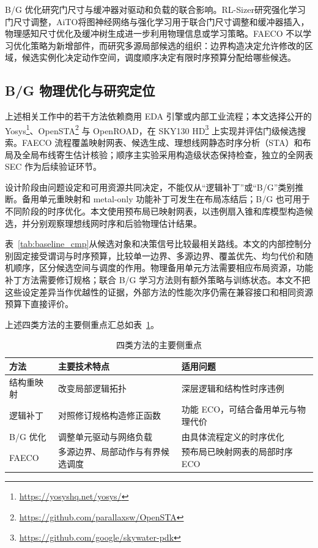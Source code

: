 \documentclass[twocolumn,10pt,fontset=windows]{ctexart}
\begin{document}
B/G 优化研究门尺寸与缓冲器对驱动和负载的联合影响。RL-Sizer\cite{liu2021rlsizer}研究强化学习门尺寸调整，AiTO\cite{chen2024aito}将图神经网络与强化学习用于联合门尺寸调整和缓冲器插入，物理感知尺寸优化\cite{huang2025phys}及缓冲树生成\cite{zhang2025buffalo}进一步利用物理信息或学习策略。FAECO 不以学习优化策略为新增部件，而研究多源局部候选的组织：边界构造决定允许修改的区域，候选实例化决定动作空间，调度顺序决定有限时序预算分配给哪些候选。

\subsection{B/G 物理优化与研究定位}
上述相关工作中的若干方法依赖商用 EDA 引擎或内部工业流程；本文选择公开的 Yosys\footnote{\url{https://yosyshq.net/yosys/}}、OpenSTA\footnote{\url{https://github.com/parallaxsw/OpenSTA}} 与 OpenROAD\cite{openroad}，在 SKY130 HD\footnote{\url{https://github.com/google/skywater-pdk}} 上实现并评估门级候选搜索。FAECO 流程覆盖映射网表、候选生成、理想线网静态时序分析（STA）和布局及全局布线寄生估计核验；顺序主实验采用构造级状态保持检查，独立的全网表 SEC 作为后续验证环节。

设计阶段由问题设定和可用资源共同决定，不能仅从“逻辑补丁”或“B/G”类别推断。备用单元重映射和 metal-only 功能补丁可发生在布局冻结后；B/G 也可用于不同阶段的时序优化。本文使用预布局已映射网表，以违例扇入锥和库模型构造候选，并分别观察理想线网时序和后验物理估计结果。

表~\ref{tab:baseline_cmp}从候选对象和决策信号比较最相关路线。本文的内部控制分别固定接受谓词与时序预算，比较单一边界、多源边界、覆盖优先、均匀代价和随机顺序，区分候选空间与调度的作用。物理备用单元方法需要相应布局资源，功能补丁方法需要修订规格；联合 B/G 学习方法则有额外策略与训练状态。本文不把这些设定差异当作优越性的证据，外部方法的性能次序仍需在兼容接口和相同资源预算下直接评价。

上述四类方法的主要侧重点汇总如表~\ref{tab:related_diff}。

\begin{table}[H]
\centering
\caption{四类方法的主要侧重点}
\label{tab:related_diff}
\footnotesize
\setlength{\tabcolsep}{2pt}
\begin{tabular}{>{\raggedright\arraybackslash}p{1.55cm}>{\raggedright\arraybackslash}p{2.55cm}>{\raggedright\arraybackslash}p{3.2cm}}
\toprule
\textbf{方法} & \textbf{主要技术特点} & \textbf{适用问题} \\
\midrule
结构重映射 & 改变局部逻辑拓扑 & 深层逻辑和结构性时序违例 \\
逻辑补丁 & 对照修订规格构造修正函数 & 功能 ECO，可结合备用单元与物理代价 \\
B/G 优化 & 调整单元驱动与网络负载 & 由具体流程定义的时序优化 \\
FAECO & 多源边界、局部动作与有界候选调度 & 预布局已映射网表的局部时序 ECO \\
\bottomrule
\end{tabular}
\end{table}
\end{document}

